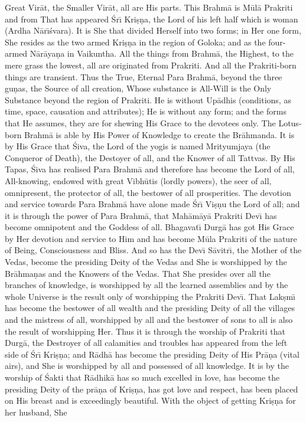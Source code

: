 Great Vir\=at, the Smaller Vir\=at, all are His parts. This Brahm\=a is M\=ul\=a Prakriti and from That has appeared \'Sr\={\i} Kri\d{s}\d{n}a, the Lord of his left half which is woman (Ardha N\=ar\={\i}\'svara). It is She that divided Herself into two forms; in Her one form, She resides as the two armed Kri\d{s}\d{n}a in the region of Goloka; and as the four-armed N\=ar\=aya\d{n}a in Vaikuntha. All the things from Brahm\=a, the Highest, to the mere grass the lowest, all are originated from Prakriti. And all the Prakriti-born things are transient. Thus the True, Eternal Para Brahm\=a, beyond the three gu\d{n}as, the Source of all creation, Whose substance is All-Will is the Only Substance beyond the region of Prakriti. He is without Up\=adhis (conditions, as time, space, causation and attributes); He is without any form; and the forms that He assumes, they are for shewing His Grace to the devotees only. The Lotus-born Brahm\=a is able by His Power of Knowledge to create the Br\=ahmanda. It is by His Grace that \'Siva, the Lord of the yogis is named Mrityumjaya (the Conqueror of Death), the Destoyer of all, and the Knower of all Tattvas. By His Tapas, \'Siva has realised Para Brahm\=a and therefore has become the Lord of all, All-knowing, endowed with great Vibh\=utis (lordly powers), the seer of all, omnipresent, the protector of all, the bestower of all prosperities. The devotion and service towards Para Brahm\=a have alone made \'Sr\={\i} Vi\d{s}\d{n}u the Lord of all; and it is through the power of Para Brahm\=a, that Mah\=am\=ay\=a Prakriti Dev\={\i} has become omnipotent and the Goddess of all. Bhagavat\={\i} Durg\=a has got His Grace by Her devotion and service to Him and has become M\=ula Prakriti of the nature of Being, Consciousness and Bliss. And so has the Dev\={\i} S\=avitr\={\i}, the Mother of the Vedas, become the presiding Deity of the Vedas and She is worshipped by the Br\=ahma\d{n}as and the Knowers of the Vedas. That She presides over all the branches of knowledge, is worshipped by all the learned assemblies and by the whole Universe is the result only of worshipping the Prakriti Dev\={\i}. That Lak\d{s}m\={\i} has become the bestower of all wealth and the presiding Deity of all the villages and the mistress of all, worshipped by all and the bestower of sons to all is also the result of worshipping Her. Thus it is through the worship of Prakriti that Durg\=a, the Destroyer of all calamities and troubles has appeared from the left side of \'Sr\={\i} Kri\d{s}\d{n}a; and R\=adh\=a has become the presiding Deity of His Pr\=a\d{n}a (vital airs), and She is worshipped by all and possessed of all knowledge. It is by the worship of \'Sakti that R\=adhik\=a has so much excelled in love, has become the presiding Deity of the pr\=a\d{n}a of Kri\d{s}\d{n}a, has got love and respect, has been placed on His breast and is exceedingly beautiful. With the object of getting Kri\d{s}\d{n}a for her husband, She

